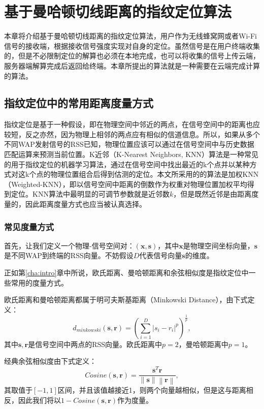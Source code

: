 \chapter{基于曼哈顿切线距离的指纹定位算法}
\label{cha:fingerprint}

本章将介绍基于曼哈顿切线距离的指纹定位算法，用户作为无线蜂窝网或者Wi-Fi信号的接收端，根据接收信号强度实现对自身的定位。虽然信号是在用户终端收集的，但是不必限制定位的解算也必须在本地完成，也可以将收集的信号上传云端，服务器端解算完成后返回给终端。本章所提出的算法就是一种需要在云端完成计算的算法。

\section{指纹定位中的常用距离度量方式}

指纹定位是基于一种假设，即在物理空间中邻近的两点，在信号空间中的距离也应较短，反之亦然，因为物理上相邻的两点应有相似的信道信息。所以，如果从多个不同WAP发射信号的RSS已知，物理位置应该可以通过在信号空间中与历史数据匹配运算来预测当前位置。K近邻（K-Nearest Neighbors, KNN）算法是一种常见的用于指纹定位的机器学习算法，通过在信号空间中找出最近的k个点并以某种方式对这k个点的物理位置组合后得到估测的定位。本文所采用的的算法是加权KNN（Weighted-KNN），即以信号空间中距离的倒数作为权重对物理位置加权平均得到定位。KNN算法中最明显的可调节参数就是近邻数$k$，但是既然近邻是由距离度量的，因此距离度量方式也应当被认真选择。

\subsection{常见度量方式}

首先，让我们定义一个物理-信号空间对：$(\mathbf{x}, \mathbf{s})$，其中$\mathbf{x}$是物理空间坐标向量，$\mathbf{s}$是不同WAP到终端的RSS向量。不妨假设$D$代表信号向量$\mathbf{s}$的维度。

正如第\ref{cha:intro}章中所说，欧氏距离、曼哈顿距离和余弦相似度是指纹定位中一些常用的度量方式。

欧氏距离和曼哈顿距离都属于明可夫斯基距离（Minkowski Distance），由下式定义：
\begin{equation}
d_{minkowski}(\mathbf{s}, \mathbf{r}) = \left(\sum_{i=1}^{D} {{\left| s_i - r_i \right|}^p}\right)^{\frac{1}{p}}, \label{eq:minkowski}
\end{equation}
其中$\mathbf{s}, \mathbf{r}$是信号空间中两点的RSS向量。欧氏距离中$p=2$，曼哈顿距离中$p=1$。

经典余弦相似度由下式定义：
\begin{equation}
Cosine(\mathbf{s}, \mathbf{r}) = \frac{\mathbf{s}^T\mathbf{r}}{\left\|\mathbf{s}\right\|\left\|\mathbf{r}\right\|}, \label{eq:cosine}
\end{equation}
其取值于$[-1, 1]$区间，并且该值越接近1，则两个向量越相似，但是这与距离相反，因此我们将以$1 - Cosine(\mathbf{s}, \mathbf{r})$作为度量。


